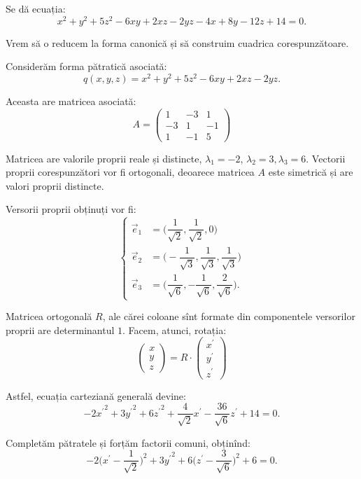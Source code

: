 \begin{example}
	Se dă ecuația: 
 \[
	x^2 + y^2 + 5z^2 - 6xy + 2xz - 2yz - 4x + 8y - 12z + 14 = 0.
\]

Vrem să o reducem la forma canonică și să construim cuadrica corespunzătoare.

Considerăm forma pătratică asociată: 
 \[
	q(x, y, z) = x^2 + y^2 + 5z^2 - 6xy + 2xz - 2yz.
\]

Aceasta are matricea asociată: 
 \[
	A = \begin{pmatrix}
	        1 & -3 & 1 \\
	        -3 & 1 & -1 \\
	        1 & -1 & 5
        \end{pmatrix}
\]

Matricea are valorile proprii reale și distincte, $\lambda_1 = -2$,
$\lambda_2 = 3, \lambda_3 = 6$. Vectorii proprii corespunzători vor fi 
ortogonali, deoarece matricea $A$ este simetrică și are valori proprii 
distincte.

Versorii proprii obținuți vor fi: 
 \[
\begin{cases}
\vec{e}_1 &= \Big( \dfrac{1}{\sqrt{2}}, \dfrac{1}{\sqrt{2}}, 0 \Big) \\
\vec{e}_2 &= \Big( -\dfrac{1}{\sqrt{3}}, \dfrac{1}{\sqrt{3}},
                    \dfrac{1}{\sqrt{3}} \Big) \\
\vec{e}_3 &= \Big( \dfrac{1}{\sqrt{6}}, - \dfrac{1}{\sqrt{6}},
                \dfrac{2}{\sqrt{6}} \Big).
\end{cases}
\]

Matricea ortogonală $R$, ale cărei coloane sînt formate din componentele
versorilor proprii are determinantul $1$. Facem, atunci, rotația: 
 \[
	\begin{pmatrix}
	    x \\ y \\ z
    \end{pmatrix} = R \cdot \begin{pmatrix}
	                            x^{\prime} \\ y^{\prime} \\ z^{\prime}
                            \end{pmatrix}
\]

Astfel, ecuația carteziană generală devine: 
 \[
	-2{x^{\prime}}^2 + 3 {y^{\prime}}^2 + 6 {z^{\prime}}^2 +
	\dfrac{4}{\sqrt{2}} x^{\prime} - \dfrac{36}{\sqrt{6}}z^{\prime} + 14 = 0.
\]

Completăm pătratele și forțăm factorii comuni, obținînd: 
 \[
	-2 \Big( x^{\prime} - \dfrac{1}{\sqrt{2}} \Big)^2 + 3 {y^{\prime}}^2 + 
	6 \Big( z^{\prime} - \dfrac{3}{\sqrt{6}} \Big)^2 + 6 = 0.
\]


\end{example}
